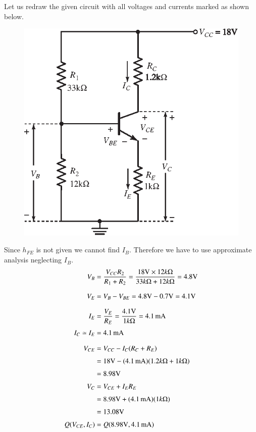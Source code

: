 \begin{solution}
Let us redraw the given circuit with all voltages and currents marked as shown below.
\begin{figure}[H]
\centering
\includegraphics[scale=1.05]{chap3/S3-EE-03-IN024.eps}
\end{figure}

Since $h_{FE}$ is not given we cannot find $I_{B}$. Therefore we have to use approximate analysis neglecting $I_{B}$.
\begin{align*}
V_{B} &= \frac{V_{CC}R_{2}}{R_{1}+R_{2}}=\frac{18\text{V}\times 12 k\Omega}{33 k\Omega + 12 k\Omega}=4.8 \text{V}\\[7pt]
V_{E} &= V_{B}-V_{BE}= 4.8\text{V}-0.7\text{V}= 4.1\text{V}\\[7pt]
I_{E} &= \frac{V_{E}}{R_{E}}= \frac{4.1\text{V}}{1 k\Omega}= 4.1\text{\,mA}\\[3pt]
I_{C}\simeq I_{E} &= 4.1\text{\,mA}\\[7pt]
V_{CE} &= V_{CC}-I_{C}(R_{C}+R_{E})\\[3pt]
&= 18\text{V}-(4.1\text{\,mA})(1.2 k\Omega + 1k\Omega)\\[3pt]
&= 8.98\text{V}\\[3pt]
V_{C} &= V_{CE}+I_{E}R_{E}\\[3pt]
&= 8.98\text{V}+(4.1 \text{\,mA})(1 k\Omega)\\[3pt]
&= 13.08\text{V}\\[3pt]
Q(V_{CE},I_{C}) &= Q(8.98\text{V}, 4.1 \text{\,mA})
\end{align*}


\end{solution}

